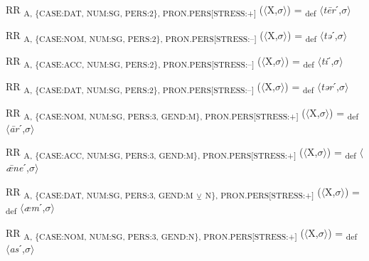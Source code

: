 {\begin{exe}
 RR \textsubscript{A, \{CASE:DAT, NUM:SG, PERS:2\}, PRON.PERS[STRESS:+]} ($\langle$X,$\sigma $$\rangle$) = \textsubscript{def} $\langle$\textit{t\=er}ˊ,$\sigma $$\rangle$
\end{exe}

\begin{exe}
 RR \textsubscript{A, \{CASE:NOM, NUM:SG, PERS:2\}, PRON.PERS[STRESS:–]} ($\langle$X,$\sigma $$\rangle$) = \textsubscript{def} $\langle$\textit{tə}ˊ,$\sigma $$\rangle$
\end{exe}

\begin{exe}
 RR \textsubscript{A, \{CASE:ACC, NUM:SG, PERS:2\}, PRON.PERS[STRESS:–]} ($\langle$X,$\sigma $$\rangle$) = \textsubscript{def} $\langle$\textit{ti}ˊ,$\sigma $$\rangle$
\end{exe}

\begin{exe}
 RR \textsubscript{A, \{CASE:DAT, NUM:SG, PERS:2\}, PRON.PERS[STRESS:–]} ($\langle$X,$\sigma $$\rangle$) = \textsubscript{def} $\langle$\textit{tər}ˊ,$\sigma $$\rangle$
\end{exe}

\begin{exe}
 RR \textsubscript{A, \{CASE:NOM, NUM:SG, PERS:3, GEND:M\}, PRON.PERS[STRESS:+]} ($\langle$X,$\sigma $$\rangle$) = \textsubscript{def} $\langle$\textit{\=ar}ˊ,$\sigma $$\rangle$
\end{exe}

\begin{exe}
 RR \textsubscript{A, \{CASE:ACC, NUM:SG, PERS:3, GEND:M\}, PRON.PERS[STRESS:+]} ($\langle$X,$\sigma $$\rangle$) = \textsubscript{def} $\langle$\textit{ǣne}ˊ,$\sigma $$\rangle$
\end{exe}

\begin{exe}
 RR \textsubscript{A, \{CASE:DAT, NUM:SG, PERS:3, GEND:M} \textsubscript{${\veebar}$}\textsubscript{ N\}, PRON.PERS[STRESS:+]} ($\langle$X,$\sigma $$\rangle$) = \textsubscript{def} $\langle$\textit{æm}ˊ,$\sigma $$\rangle$
\end{exe}

\begin{exe}
 RR \textsubscript{A, \{CASE:NOM, NUM:SG, PERS:3, GEND:N\}, PRON.PERS[STRESS:+]} ($\langle$X,$\sigma $$\rangle$) = \textsubscript{def} $\langle$\textit{as}ˊ,$\sigma $$\rangle$
\end{exe}

}

